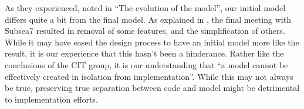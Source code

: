As they experienced, noted in ``The evolution of the model'', our
initial model differs quite a bit from the final model. As explained
in , the final meeting with Subsea7 resulted
in removal of some features, and the simplification of others. While
it may have eased the design process to have an initial model more
like the result, it is our experience that this hasn't been a
hinderance. Rather like the conclusions of the CIT group, it is our
understanding that ``a model cannot be effectively created in
isolation from implementation''. While this may not always be true,
preserving true separation between code and model might be detrimental
to implementation efforts.
